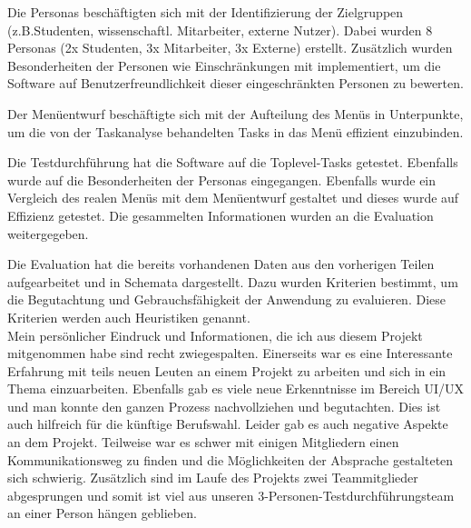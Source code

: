 \documentclass{TUBAFarbeiten}
\begin{document}
Die Personas beschäftigten sich mit der Identifizierung der Zielgruppen (z.B.Studenten, wissenschaftl. Mitarbeiter, externe Nutzer). Dabei wurden 8 Personas (2x Studenten, 3x Mitarbeiter, 3x Externe) erstellt. Zusätzlich wurden Besonderheiten der Personen wie Einschränkungen mit implementiert, um die Software auf Benutzerfreundlichkeit dieser eingeschränkten Personen zu bewerten.

Der Menüentwurf beschäftigte sich mit der Aufteilung des Menüs in Unterpunkte, um die von der Taskanalyse behandelten Tasks in das Menü effizient einzubinden. 

Die Testdurchführung hat die Software auf die Toplevel-Tasks getestet. Ebenfalls wurde auf die Besonderheiten der Personas eingegangen. Ebenfalls wurde ein Vergleich des realen Menüs mit dem Menüentwurf gestaltet und dieses wurde auf Effizienz getestet. Die gesammelten Informationen wurden an die Evaluation weitergegeben.

Die Evaluation hat die bereits vorhandenen Daten aus den vorherigen Teilen aufgearbeitet und in Schemata dargestellt. Dazu wurden Kriterien bestimmt, um die Begutachtung und Gebrauchsfähigkeit der Anwendung zu evaluieren. Diese Kriterien werden auch Heuristiken genannt.\\

Mein persönlicher Eindruck und Informationen, die ich aus diesem Projekt mitgenommen habe sind recht zwiegespalten. Einerseits war es eine Interessante Erfahrung mit teils neuen Leuten an einem Projekt zu arbeiten und sich in ein Thema einzuarbeiten. Ebenfalls gab es viele neue Erkenntnisse im Bereich UI/UX und man konnte den ganzen Prozess nachvollziehen und begutachten. Dies ist auch hilfreich für die künftige Berufswahl. Leider gab es auch negative Aspekte an dem Projekt. Teilweise war es schwer mit einigen Mitgliedern einen Kommunikationsweg zu finden und die Möglichkeiten der Absprache gestalteten sich schwierig. Zusätzlich sind im Laufe des Projekts zwei Teammitglieder abgesprungen und somit ist viel aus unseren 3-Personen-Testdurchführungsteam an einer Person hängen geblieben.\\
\end{document}
